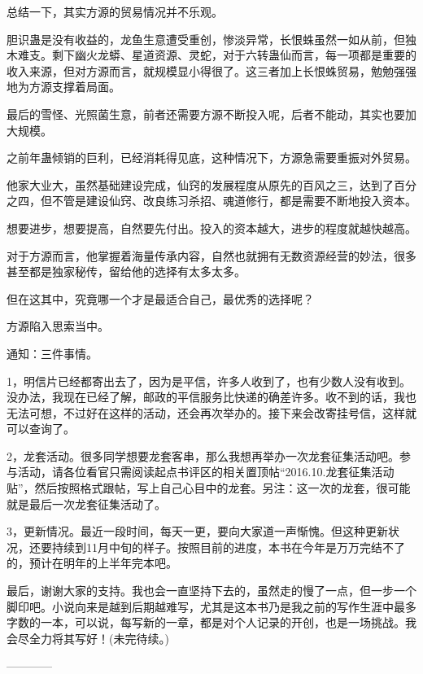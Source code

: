 \begin{this_body}
总结一下，其实方源的贸易情况并不乐观。

胆识蛊是没有收益的，龙鱼生意遭受重创，惨淡异常，长恨蛛虽然一如从前，但独木难支。剩下幽火龙蟒、星道资源、灵蛇，对于六转蛊仙而言，每一项都是重要的收入来源，但对方源而言，就规模显小得很了。这三者加上长恨蛛贸易，勉勉强强地为方源支撑着局面。

最后的雪怪、光照菌生意，前者还需要方源不断投入呢，后者不能动，其实也要加大规模。

之前年蛊倾销的巨利，已经消耗得见底，这种情况下，方源急需要重振对外贸易。

他家大业大，虽然基础建设完成，仙窍的发展程度从原先的百风之三，达到了百分之四，但不管是建设仙窍、改良练习杀招、魂道修行，都是需要不断地投入资本。

想要进步，想要提高，自然要先付出。投入的资本越大，进步的程度就越快越高。

对于方源而言，他掌握着海量传承内容，自然也就拥有无数资源经营的妙法，很多甚至都是独家秘传，留给他的选择有太多太多。

但在这其中，究竟哪一个才是最适合自己，最优秀的选择呢？

方源陷入思索当中。

通知：三件事情。

1，明信片已经都寄出去了，因为是平信，许多人收到了，也有少数人没有收到。没办法，我现在已经了解，邮政的平信服务比快递的确差许多。收不到的话，我也无法可想，不过好在这样的活动，还会再次举办的。接下来会改寄挂号信，这样就可以查询了。

2，龙套活动。很多同学想要龙套客串，那么我想再举办一次龙套征集活动吧。参与活动，请各位看官只需阅读起点书评区的相关置顶帖“2016.10.龙套征集活动贴”，然后按照格式跟帖，写上自己心目中的龙套。另注：这一次的龙套，很可能就是最后一次龙套征集活动了。

3，更新情况。最近一段时间，每天一更，要向大家道一声惭愧。但这种更新状况，还要持续到11月中旬的样子。按照目前的进度，本书在今年是万万完结不了的，预计在明年的上半年完本吧。

最后，谢谢大家的支持。我也会一直坚持下去的，虽然走的慢了一点，但一步一个脚印吧。小说向来是越到后期越难写，尤其是这本书乃是我之前的写作生涯中最多字数的一本，可以说，每写新的一章，都是对个人记录的开创，也是一场挑战。我会尽全力将其写好！(未完待续。)

------------

\end{this_body}

